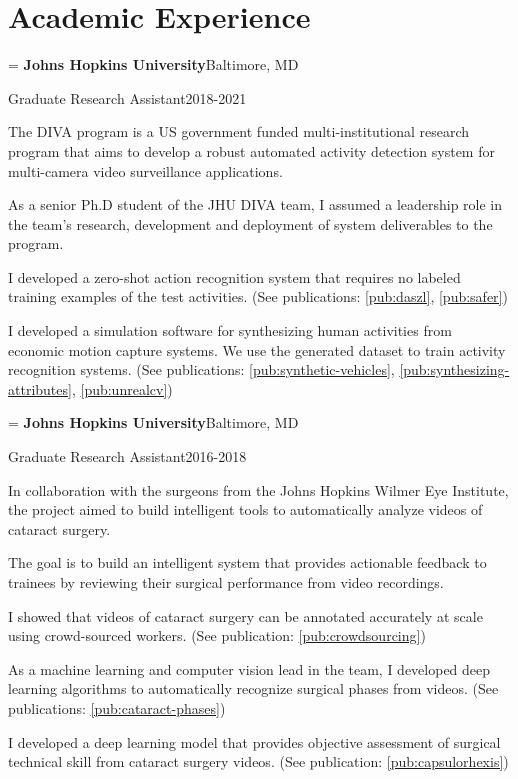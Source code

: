 \documentclass[11pt,letterpaper]{article}
\makeatletter
\newlength{\entryindent}\setlength{\entryindent}{13.94pt}
\newcommand{\entry}[4]{%
  \par\if@nobreak\vskip 2.3pt\else\vskip 8.3pt\fi
  {\leftskip=\entryindent\rightskip=1.87pt
   \textbf{#1}\hfill #2\par\nobreak\vskip 1.5pt
   {\small #3\hfill #4\par}}\nobreak}
\newcommand{\pubref}[1]{\ref{pub:#1}}
\makeatother
\begin{document}
\section*{Academic Experience}

\entry{Johns Hopkins University}{Baltimore, MD}
      {Graduate Research Assistant}{2018-2021}
\begin{cvitems}
  \item The DIVA program is a US government funded multi-institutional research program that aims to develop a
        robust automated activity detection system for multi-camera video surveillance applications.
  \item As a senior Ph.D student of the JHU DIVA team, I assumed a leadership role in the team's research,
        development and deployment of system deliverables to the program.
  \item I developed a zero-shot action recognition system that requires no labeled training examples of the test
        activities. (See publications: \pubref{daszl}, \pubref{safer})
  \item I developed a simulation software for synthesizing human activities from economic motion capture systems. We
        use the generated dataset to train activity recognition systems.
        (See publications: \pubref{synthetic-vehicles}, \pubref{synthesizing-attributes}, \pubref{unrealcv})
\end{cvitems}

\entry{Johns Hopkins University}{Baltimore, MD}
      {Graduate Research Assistant}{2016-2018}
\begin{cvitems}
  \item In collaboration with the surgeons from the Johns Hopkins Wilmer Eye Institute, the project aimed to build
        intelligent tools to automatically analyze videos of cataract surgery.
  \item The goal is to build an intelligent system that provides actionable feedback to trainees by reviewing their
        surgical performance from video recordings.
  \item I showed that videos of cataract surgery can be annotated accurately at scale using crowd-sourced workers. (See
        publication: \pubref{crowdsourcing})
  \item As a machine learning and computer vision lead in the team, I developed deep learning algorithms to
        automatically recognize surgical phases from videos. (See publications: \pubref{cataract-phases})
  \item I developed a deep learning model that provides objective assessment of surgical technical skill from cataract
        surgery videos. (See publication: \pubref{capsulorhexis})
\end{cvitems}
\end{document}
